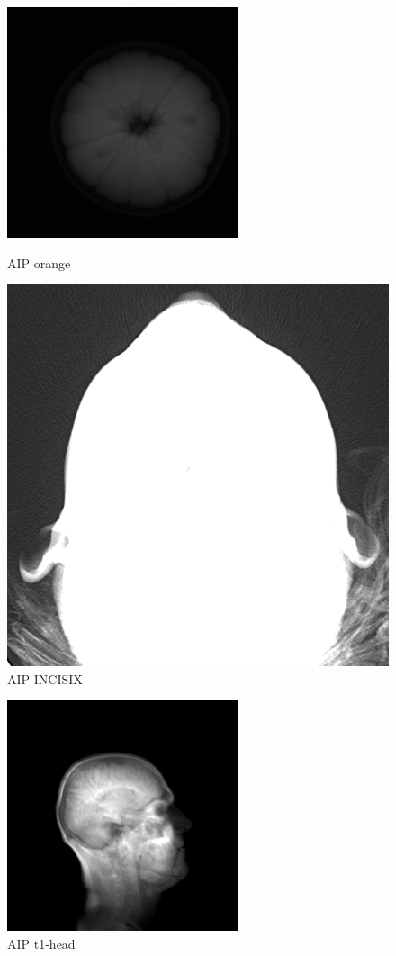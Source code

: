 \documentclass{article}
\begin{document}
\begin{figure}[h]
\centerline{\includegraphics[scale=0.6]{./sortiet1orangemoy.png}}
\caption{AIP orange}

\centerline{\includegraphics[scale=0.4]{./sortiet1INCISIXmoy.png}}
\caption{AIP INCISIX}
\end{figure}


\begin{figure}[h]
\centerline{\includegraphics[scale=0.7]{./sortiet1headmoy.png}}
\caption{AIP t1-head}
\end{figure}
\end{document}
